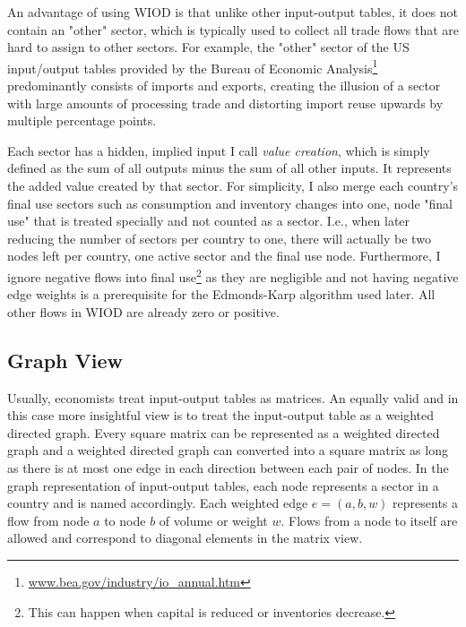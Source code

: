 \documentclass[english]{uzhpub}
\begin{document}
An advantage of using WIOD is that unlike other input-output tables, it does not contain an "other" sector, which is typically used to collect all trade flows that are hard to assign to other sectors. For example, the "other" sector of the US input/output tables provided by the Bureau of Economic Analysis\footnote{\href{http://www.bea.gov/industry/io_annual.htm}{www.bea.gov/industry/io\_annual.htm}} predominantly consists of imports and exports, creating the illusion of a sector with large amounts of processing trade and distorting import reuse upwards by multiple percentage points.

Each sector has a hidden, implied input I call \emph{value creation}, which is simply defined as the sum of all outputs minus the sum of all other inputs. It represents the added value created by that sector. For simplicity, I also merge each country's final use sectors such as consumption and inventory changes into one, node "final use" that is treated specially and not counted as a sector. I.e., when later reducing the number of sectors per country to one, there will actually be two nodes left per country, one active sector and the final use node. Furthermore, I ignore negative flows into final use\footnote{This can happen when capital is reduced or inventories decrease.} as they are negligible and not having negative edge weights is a prerequisite for the Edmonds-Karp algorithm used later. \citep{edmonds1972theoretical} All other flows in WIOD are already zero or positive.

\subsection{Graph View}
\label{sec:graphview}
Usually, economists treat input-output tables as matrices. An equally valid and in this case more insightful view is to treat the input-output table as a weighted directed graph. Every square matrix can be represented as a weighted directed graph and a weighted directed graph can converted into a square matrix as long as there is at most one edge in each direction between each pair of nodes. In the graph representation of input-output tables, each node represents a sector in a country and is named accordingly. Each weighted edge $e=(a, b, w)$ represents a flow from node $a$ to node $b$ of volume or weight $w$. Flows from a node to itself are allowed and correspond to diagonal elements in the matrix view.
\end{document}

